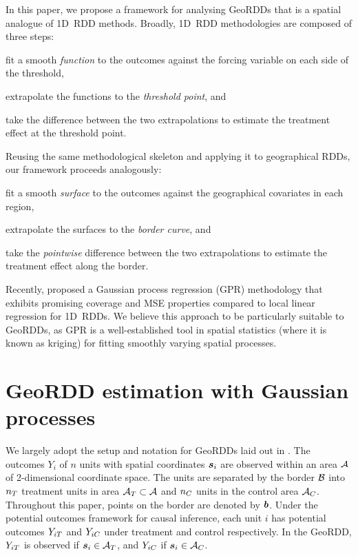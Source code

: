 \documentclass{article}
\begin{document}
\label{sec:framework}
In this paper, we propose a framework for analysing GeoRDDs that is a spatial analogue of 1D~RDD methods.
Broadly, 1D~RDD methodologies are composed of three steps:
\begin{flatlist}
    \item
        fit a smooth \emph{function} to the outcomes against the forcing variable on each side of the threshold,
    \item
        extrapolate the functions to the \emph{threshold point}, and
    \item
        take the difference between the two extrapolations to estimate the treatment effect at the threshold point.
\end{flatlist}
Reusing the same methodological skeleton and applying it to geographical RDDs, our framework proceeds analogously:
\begin{flatlist}
    \item
        fit a smooth \emph{surface} to the outcomes against the geographical covariates in each region,
    \item
        extrapolate the surfaces to the \emph{border curve}, and
    \item
        take the \emph{pointwise} difference between the two extrapolations to estimate the treatment effect along the border.
\end{flatlist}

Recently, \cite{Branson:2017qy} proposed a Gaussian process regression (GPR) methodology that exhibits promising coverage and MSE properties compared to local linear regression for 1D~RDDs.
We believe this approach to be particularly suitable to GeoRDDs, as GPR is a well-established tool in spatial statistics (where it is known as kriging) for fitting smoothly varying spatial processes.

\section{GeoRDD estimation with Gaussian processes}
\label{sec:geordd_model}

We largely adopt the setup and notation for GeoRDDs laid out in \cite{keele_titiunik_2015}.
The outcomes \(Y_i\) of \(n\) units with spatial coordinates \(\bm{s}_i\) are observed within an area \(\mathcal{A}\) of 2-dimensional coordinate space.
The units are separated by the border \(\mathcal{B}\) into \(n_T\) treatment units in area \(\mathcal{A}{}_{T} \subset \mathcal{A}\)
and \(n_C\) units in the control area \(\mathcal{A}{}_{C}\).
Throughout this paper, points on the border are denoted by \(\bm{b}\).
Under the potential outcomes framework for causal inference, each unit \(i\) has potential outcomes \(Y_{iT}\) and \(Y_{iC}\) under treatment and control respectively.
In the GeoRDD, \(Y_{iT}\) is observed if \(\bm{s}_i \in \mathcal{A}{}_{T}\), and \(Y_{iC}\) if \(\bm{s}_i \in \mathcal{A}{}_{C}\).
\end{document}
